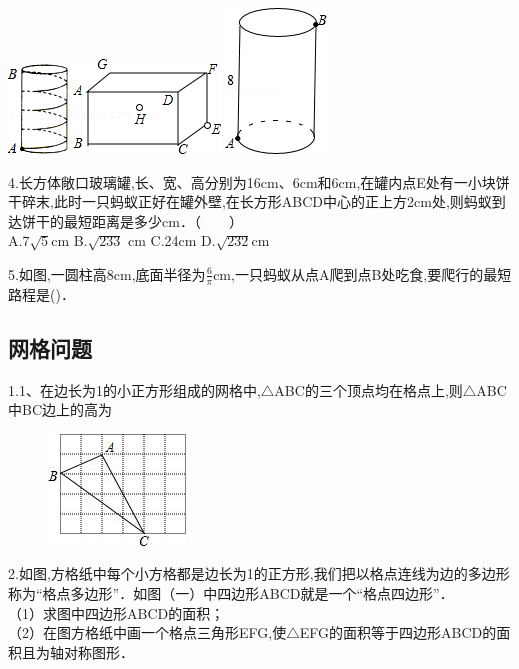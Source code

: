 \documentclass[14pt,UTF-8,a4paper,titlepage]{ctexbook}
\begin{document}
\includegraphics[scale=1.2]{8.jpg} \hspace{1cm}
\includegraphics[scale=1.2]{10.jpg}  \hspace{1cm}
\includegraphics[scale=0.8]{11.jpg}\par
4.长方体敞口玻璃罐,长、宽、高分别为16cm、6cm和6cm,在罐内点E处有一小块饼干碎末,此时一只蚂蚁正好在罐外壁,在长方形ABCD中心的正上方2cm处,则蚂蚁到达饼干的最短距离是多少cm．（　　）\\
A.$7\sqrt{5}$cm \hfill B.$\sqrt{233}$ cm \hfill  C.24cm  \hfill  D.$\sqrt{232}$cm \par

5.如图,一圆柱高8cm,底面半径为$\frac{6}{\pi}$cm,一只蚂蚁从点A爬到点B处吃食,要爬行的最短路程是()．
\subsection{网格问题}
1.1、在边长为1的小正方形组成的网格中,$\bigtriangleup$ABC的三个顶点均在格点上,则$\bigtriangleup$ABC中BC边上的高为
\begin{figure}[h]
\includegraphics[scale=1]{12.jpg}
\end{figure}
2.如图,方格纸中每个小方格都是边长为1的正方形,我们把以格点连线为边的多边形称为“格点多边形”．如图（一）中四边形ABCD就是一个“格点四边形”．\\
（1）求图中四边形ABCD的面积；\\
（2）在图方格纸中画一个格点三角形EFG,使$\bigtriangleup$EFG的面积等于四边形ABCD的面积且为轴对称图形．\par
\end{document}
